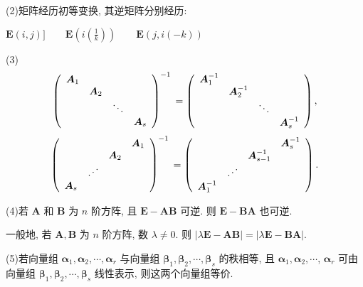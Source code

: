 \documentclass{article}
\begin{document}
(2)矩阵经历初等变换, 其逆矩阵分别经历:

$\boldsymbol{E}(i, j) ]\qquad \boldsymbol{E}(i(\frac{1}{k})) \qquad \boldsymbol{E}(j, i(-k))$

(3)
$$
	\left(\begin{array}{cccc}
		\boldsymbol{A}_{1} & & & \\
		& \boldsymbol{A}_{2} & & \\
		& & \ddots & \\
		& & & \boldsymbol{A}_{s}
	\end{array}\right)^{-1} \\
=
	\left(\begin{array}{cccc}
		\boldsymbol{A}_{1}^{-1} & & & \\
		& \boldsymbol{A}_{2}^{-1} & & \\
		& & \ddots & \\
		& & & \boldsymbol{A}_{s}^{-1}
	\end{array}\right),
$$
$$
\left(\begin{array}{cccc}
	& & & \boldsymbol{A}_{1} \\
	& & \boldsymbol{A}_{2} & \\
	& \iddots & & \\
	\boldsymbol{A}_{s}& & &
\end{array}\right)^{-1} \\
=
\left(\begin{array}{cccc}
	& & &\boldsymbol{A}_{s}^{-1} \\
	& & \boldsymbol{A}_{s-1}^{-1} & \\
	& \iddots & & \\
	\boldsymbol{A}_{1}^{-1} & & &
\end{array}\right).
$$

(4)若 $\boldsymbol{A}$ 和 $\boldsymbol{B}$ 为 $n$ 阶方阵, 且 $\boldsymbol{E}-\boldsymbol{A} \boldsymbol{B}$ 可逆. 则 $\boldsymbol{E}-\boldsymbol{B} \boldsymbol{A}$ 也可逆.

一般地, 若 $\boldsymbol{A}, \boldsymbol{B}$ 为 $n$ 阶方阵, 数 $\lambda \neq 0$. 则 $|\lambda \boldsymbol{E}-\boldsymbol{A B}|=|\lambda \boldsymbol{E}-\boldsymbol{B} \boldsymbol{A}|$.

(5)若向量组 $\boldsymbol{\alpha}_{1}, \boldsymbol{\alpha}_{2}, \cdots, \boldsymbol{\alpha}_{r}$ 与向量组 $\boldsymbol{\beta}_{1}, \boldsymbol{\beta}_{2}, \cdots, \boldsymbol{\beta}_{s}$ 的秩相等, 且 $\boldsymbol{\alpha}_{1}, \boldsymbol{\alpha}_{2}, \cdots$, $\boldsymbol{\alpha}_{r}$ 可由向量组 $\boldsymbol{\beta}_{1}, \boldsymbol{\beta}_{2}, \cdots, \boldsymbol{\beta}_{s}$ 线性表示, 则这两个向量组等价.
\end{document}
